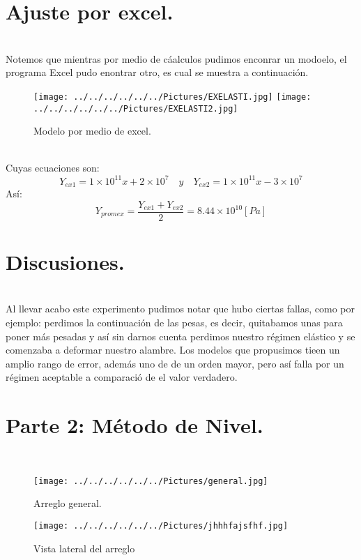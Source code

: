 \documentclass[10pt,a4paper]{article}
\begin{document}
\section*{Ajuste por excel.}\\
Notemos que mientras por medio de c\'{a}alculos pudimos enconrar un modoelo, el programa Excel pudo enontrar otro, es cual se muestra a continuaci\'{o}n.
\\
\begin{figure}[hbtp]
 \centering
 \texttt{[image: ../../../../../../Pictures/EXELASTI.jpg]} 
 \texttt{[image: ../../../../../../Pictures/EXELASTI2.jpg]} 
 \caption{Modelo por medio de excel. }
\end{figure}
 \\
 Cuyas ecuaciones son:
 \[{ Y }_{ ex1 }=1\times { 10 }^{ 11 }x+2\times { 10 }^{ 7 }\quad y\quad { Y }_{ ex2 }=1\times { 10 }^{ 11 }x-3\times { 10 }^{ 7 }\]
 As\'{i}:
\[{ Y }_{ prom ex }=\frac { { Y }_{ ex1 }+{ Y }_{ ex2 } }{ 2 } =8.44\times { 10 }^{ 10 }\left[ Pa \right]\]
 \section*{Discusiones.}\\
Al llevar acabo este experimento pudimos notar que hubo ciertas fallas, como por ejemplo: perdimos la continuaci\'{o}n de las pesas, es decir, quitabamos unas para poner m\'{a}s pesadas y as\'{i} sin darnos cuenta perdimos nuestro r\'{e}gimen el\'{a}stico y se comenzaba a deformar nuestro alambre. Los modelos que propusimos tieen un amplio rango de error, adem\'{a}s uno de de un orden mayor, pero as\'{i} falla por un r\'{e}gimen aceptable a comparaci\'{o} de el valor verdadero.
\pagebreak

\section*{Parte 2: M\'{e}todo de Nivel.} \\

\begin{figure}[hbtp]
\centering
\texttt{[image: ../../../../../../Pictures/general.jpg]}   
\caption{Arreglo general.}
\end{figure}

\begin{figure}[hbtp]
\centering
\texttt{[image: ../../../../../../Pictures/jhhhfajsfhf.jpg]}   
\caption{Vista lateral del arreglo}
\end{figure}
\end{document}
